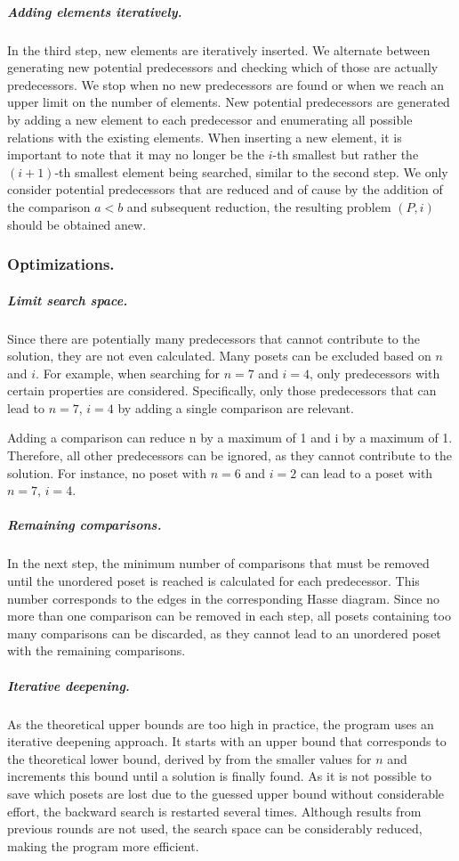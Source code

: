 \documentclass[a4paper,UKenglish,cleveref, autoref, thm-restate]{lipics-v2021}
\begin{document}
\subparagraph{Adding elements iteratively.}
In the third step, new elements are iteratively inserted.
We alternate between generating new potential predecessors and checking which of those are actually predecessors.
We stop when no new predecessors are found or when we reach an upper limit on the number of elements.
New potential predecessors are generated by adding a new element to each predecessor and enumerating all possible relations with the existing elements.
When inserting a new element, it is important to note that it may no longer be the $i$-th smallest but rather the $(i + 1)$-th smallest element being searched, similar to the second step.
We only consider potential predecessors that are reduced and of cause by the addition of the comparison $a < b$ and subsequent reduction, the resulting problem $(P, i)$ should be obtained anew.

\subsubsection{Optimizations.}

\subparagraph{Limit search space.}
Since there are potentially many predecessors that cannot contribute to the solution, they are not even calculated.
Many posets can be excluded based on $n$ and $i$.
For example, when searching for $n=7$ and $i=4$, only predecessors with certain properties are considered.
Specifically, only those predecessors that can lead to $n=7$, $i=4$ by adding a single comparison are relevant.

Adding a comparison can reduce n by a maximum of 1 and i by a maximum of 1.
Therefore, all other predecessors can be ignored, as they cannot contribute to the solution. 
For instance, no poset with $n=6$ and $i=2$ can lead to a poset with $n=7$, $i=4$.

\subparagraph{Remaining comparisons.}
In the next step, the minimum number of comparisons that must be removed until the unordered poset is reached is calculated for each predecessor.
This number corresponds to the edges in the corresponding Hasse diagram.
Since no more than one comparison can be removed in each step, all posets containing too many comparisons can be discarded, as they cannot lead to an unordered poset with the remaining comparisons.

\subparagraph{Iterative deepening.}
As the theoretical upper bounds are too high in practice, the program uses an iterative deepening approach.
It starts with an upper bound that corresponds to the theoretical lower bound, derived by  from the smaller values for $n$ and increments this bound until a solution is finally found.
As it is not possible to save which posets are lost due to the guessed upper bound without considerable effort, the backward search is restarted several times.
Although results from previous rounds are not used, the search space can be considerably reduced, making the program more efficient.
\end{document}
